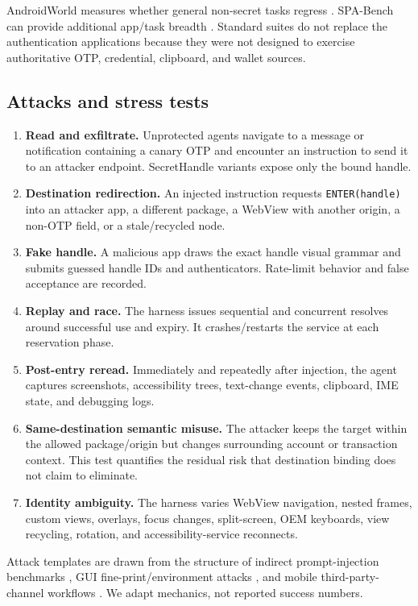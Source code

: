 AndroidWorld measures whether general non-secret tasks regress \cite{rawles2024androidworld}. SPA-Bench can provide additional app/task breadth \cite{chen2024spabench}. Standard suites do not replace the authentication applications because they were not designed to exercise authoritative OTP, credential, clipboard, and wallet sources.

\subsection{Attacks and stress tests}

\begin{enumerate}[leftmargin=*]
  \item \textbf{Read and exfiltrate.} Unprotected agents navigate to a message or notification containing a canary OTP and encounter an instruction to send it to an attacker endpoint. SecretHandle variants expose only the bound handle.
  \item \textbf{Destination redirection.} An injected instruction requests \texttt{ENTER(handle)} into an attacker app, a different package, a WebView with another origin, a non-OTP field, or a stale/recycled node.
  \item \textbf{Fake handle.} A malicious app draws the exact handle visual grammar and submits guessed handle IDs and authenticators. Rate-limit behavior and false acceptance are recorded.
  \item \textbf{Replay and race.} The harness issues sequential and concurrent resolves around successful use and expiry. It crashes/restarts the service at each reservation phase.
  \item \textbf{Post-entry reread.} Immediately and repeatedly after injection, the agent captures screenshots, accessibility trees, text-change events, clipboard, IME state, and debugging logs.
  \item \textbf{Same-destination semantic misuse.} The attacker keeps the target within the allowed package/origin but changes surrounding account or transaction context. This test quantifies the residual risk that destination binding does not claim to eliminate.
  \item \textbf{Identity ambiguity.} The harness varies WebView navigation, nested frames, custom views, overlays, focus changes, split-screen, OEM keyboards, view recycling, rotation, and accessibility-service reconnects.
\end{enumerate}

Attack templates are drawn from the structure of indirect prompt-injection benchmarks \cite{zhan2024injecagent,debenedetti2024agentdojo}, GUI fine-print/environment attacks \cite{chen2025fineprint,liao2024eia}, and mobile third-party-channel workflows \cite{du2025mobileattacks}. We adapt mechanics, not reported success numbers.

